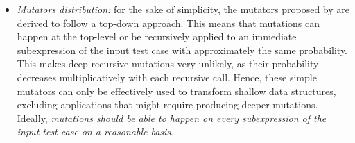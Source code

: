\documentclass[sigconf, anonymous, review]{acmart}
\newcommand{\fuzzchick}{\textit{FuzzChick}\xspace}
\begin{document}
\begin{itemize}
\item \emph{Mutators distribution:}
%
for the sake of simplicity, the mutators proposed by
\citeauthor{lampropoulos2019coverage} are derived to follow a top-down approach.
%
This means that mutations can happen at the top-level or be recursively applied
to an immediate subexpression of the input test case with approximately the same
probability.
%
%
This makes deep recursive mutations very unlikely, as their probability
decreases multiplicatively with each recursive call.
%
%
%
Hence, these simple mutators can only be effectively used to transform shallow
data structures, excluding applications that might require producing deeper
mutations.
%
%
Ideally, \emph{mutations should be able to happen on every subexpression of the
  input test case on a reasonable basis}.


%



\end{itemize}
\end{document}

